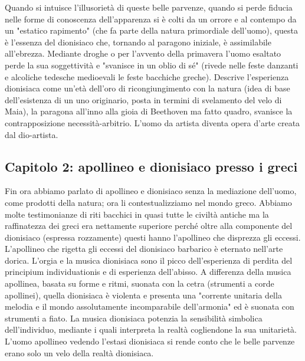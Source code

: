 \documentclass[10pt,a4paper]{article}
\begin{document}
Quando si intuisce l'illusorietà di queste belle parvenze, quando si perde fiducia nelle forme di conoscenza dell'apparenza si è colti da un orrore e al contempo da un "estatico rapimento" (che fa parte della natura primordiale dell'uomo), questa è l'essenza del dionisiaco che, tornando al paragono iniziale, è assimilabile all'ebrezza. Mediante droghe o per l'avvento della primavera l'uomo esaltato perde la sua soggettività e "svanisce in un oblio di sé" (rivede nelle feste danzanti e alcoliche tedesche medioevali le feste bacchiche greche). Descrive l'esperienza dionisiaca come un'età dell'oro di ricongiungimento con la natura (idea di base dell'esistenza di un uno originario, posta in termini di svelamento del velo di Maia), la paragona all'inno alla gioia di Beethoven ma fatto quadro, svanisce la contrapposizione necessità-arbitrio. L'uomo da artista diventa opera d'arte creata dal dio-artista.
\subsection{Capitolo 2: apollineo e dionisiaco presso i greci}
Fin ora abbiamo parlato di apollineo e dionisiaco senza la mediazione dell'uomo, come prodotti della natura; ora li contestualizziamo nel mondo greco. Abbiamo molte testimonianze di riti bacchici in quasi tutte le civiltà antiche ma la raffinatezza dei greci era nettamente superiore perché oltre alla componente del dionisiaco (espressa rozzamente) questi hanno l'apollineo che disprezza gli eccessi. L'apollineo che rigetta gli eccessi del dionisiaco barbarico è eternato nell'arte dorica. L'orgia e la musica dionisiaca sono il picco dell'esperienza di perdita del principium individuationis e di esperienza dell'abisso. A differenza della musica apollinea, basata su forme e ritmi, suonata con la cetra (strumenti a corde apollinei), quella dionisiaca è violenta e presenta una "corrente unitaria della melodia e il mondo assolutamente incomparabile dell'armonia" ed è suonata con strumenti a fiato. La musica dionisiaca potenzia la sensibilità simbolica dell'individuo, mediante i quali interpreta la realtà cogliendone la sua unitarietà. L'uomo apollineo vedendo l'estasi dionisiaca si rende conto che le belle parvenze erano solo un velo della realtà dionisiaca.
\end{document}
